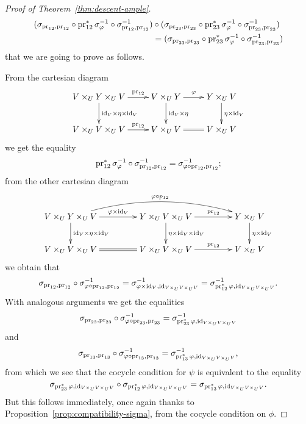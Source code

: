 \begin{4   STACKS}
\begin{4.3 Descent for morphisms of schemes}
\begin{proof}[Proof of Theorem~\ref{thm:descent-ample}]
   \begin{align*}
      (\sigma_{\operatorname{pr}_{12}, \operatorname{pr}_{12}} \circ \operatorname{pr}_{12}^{*}\sigma_{\varphi}^{-1}
      \circ \sigma_{\operatorname{pr}_{12}, \operatorname{pr}_{12}}^{-1})
   &\circ
   (\sigma_{\operatorname{pr}_{23}, \operatorname{pr}_{23}} \circ \operatorname{pr}_{23}^{*}\sigma_{\varphi}^{-1}
      \circ \sigma_{\operatorname{pr}_{23}, \operatorname{pr}_{23}}^{-1}) \\
   &=
   (\sigma_{\operatorname{pr}_{23}, \operatorname{pr}_{23}} \circ \operatorname{pr}_{23}^{*}\sigma_{\varphi}^{-1}
      \circ \sigma_{\operatorname{pr}_{23}, \operatorname{pr}_{23}}^{-1})
   \end{align*}
that we are going to prove as follows.

From the cartesian diagram
   \[
   \xymatrix{
   V\times_{U} Y\times_{U} V \ar[r]^-{\pr_{12}}
      \ar[d]^{\id_{V}\times \eta\times \id_{V}}
   & V\times_{U} Y \ar[r]^-{\phi} \ar[d]^{\id_{V}\times \eta}
   & Y\times_{U}V \ar[d]^{\eta\times \id_{V}}
   \\
   V\times_{U} V\times_{U} V \ar[r]^-{\pr_{12}}
   &V\times_{U} V \ar@{=}[r]
   &V\times_{U} V
   }
   \]
we get the equality
   \[
   \operatorname{pr}_{12}^{*}\sigma_{\varphi}^{-1} \circ \sigma_{\operatorname{pr}_{12}, \operatorname{pr}_{12}}^{-1}
      = \sigma_{\varphi\circ\operatorname{pr}_{12},\operatorname{pr}_{12}}^{-1};
   \]
from the other cartesian diagram
   \[
   \xymatrix@C+20pt{
   V\times_{U}Y\times_{U}V \ar[r]^{\phi\times\id_{V}}
      \ar[d]^{\id_{V}\times\eta\times\id_{V}}
      \ar@/^1.5pc/[rr]^{\phi\circ p_{12}}   
   & Y\times_{U}V\times_{U}V \ar[r]^-{\pr_{12}}
      \ar[d]^{\eta\times\id_{V}\times\id_{V}}
   & Y \times_{U} V\ar[d]^{\eta\times\id_{V}}
   \\
   V\times_{U}V\times_{U}V \ar@{=}[r]
   & V\times_{U}V\times_{U}V \ar[r]^-{\pr_{12}}
   & V\times_{U}V
   }
   \]
we obtain that
   \[
   \sigma_{\operatorname{pr}_{12},\operatorname{pr}_{12}} \circ \sigma_{\varphi\circ\operatorname{pr}_{12},\operatorname{pr}_{12}}^{-1}
      = \sigma_{\varphi\times\mathrm{id}_{V},\mathrm{id}_{V\times_{U}V\times_{U}V}}^{-1}
      = \sigma_{\operatorname{pr}_{12}^{*}\varphi,\mathrm{id}_{V\times_{U}V\times_{U}V}}^{-1}.
   \]
With analogous arguments we get the equalities
   \[
   \sigma_{\operatorname{pr}_{23},\operatorname{pr}_{23}} \circ \sigma_{\varphi\circ\operatorname{pr}_{23},\operatorname{pr}_{23}}^{-1}
      = \sigma_{\operatorname{pr}_{23}^{*}\varphi,\mathrm{id}_{V\times_{U}V\times_{U}V}}^{-1}
   \]
and
   \[
   \sigma_{\operatorname{pr}_{13},\operatorname{pr}_{13}} \circ \sigma_{\varphi\circ\operatorname{pr}_{13},\operatorname{pr}_{13}}^{-1}
      = \sigma_{\operatorname{pr}_{13}^{*}\varphi,\mathrm{id}_{V\times_{U}V\times_{U}V}}^{-1},
   \]
from which we see that the cocycle condition for $\psi$ is equivalent to the equality
   \[
   \sigma_{\operatorname{pr}_{23}^{*}\varphi,\mathrm{id}_{V\times_{U}V\times_{U}V}}\circ
   \sigma_{\operatorname{pr}_{12}^{*}\varphi,\mathrm{id}_{V\times_{U}V\times_{U}V}} =
   \sigma_{\operatorname{pr}_{13}^{*}\varphi,\mathrm{id}_{V\times_{U}V\times_{U}V}}.
   \]
But this follows immediately, once again thanks to Proposition~\ref{prop:compatibility-sigma}, from the cocycle condition on $\phi$.


\end{proof}
\end{4.3 Descent for morphisms of schemes}
\end{4   STACKS}
